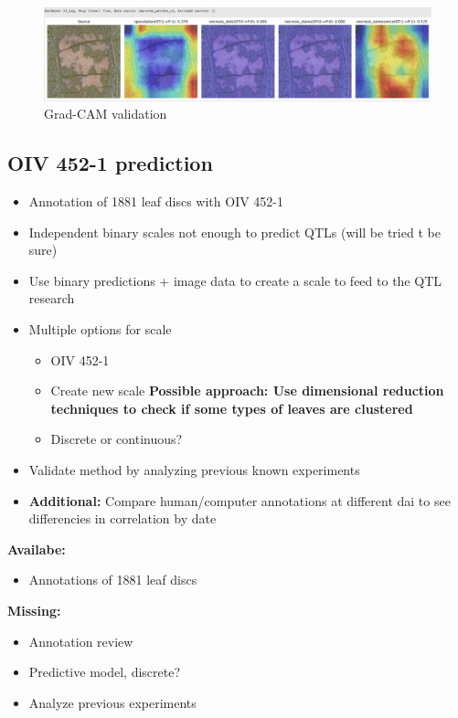 \documentclass[english]{article}
\begin{document}
\begin{figure}[H]
	\centering
	\includegraphics[width=0.8\linewidth]{gc_hf_seg_sen_high.png}
	\caption*{Grad-CAM validation}\label{fig:gradcamval}
\end{figure}

\subsection{OIV 452-1 prediction}

\begin{itemize}
	\item Annotation of 1881 leaf discs with OIV 452-1
	\item Independent binary scales not enough to predict QTLs (will be tried t be sure)
	\item Use binary predictions + image data to create a scale to feed to the QTL research
	\item Multiple options for scale
	      \begin{itemize}
		      \item OIV 452-1
		      \item Create new scale \textbf{Possible approach: Use dimensional reduction techniques to check if some types of leaves are clustered}
		      \item Discrete or continuous?
	      \end{itemize}
	\item Validate method by analyzing previous known experiments
	\item \textbf{Additional:} Compare human/computer annotations at different dai to see differencies in correlation by date
\end{itemize}

\textbf{Availabe:}
\begin{itemize}
	\item Annotations of 1881 leaf discs
\end{itemize}
\textbf{Missing:}
\begin{itemize}
	\item Annotation review
	\item Predictive model, discrete?
	\item Analyze previous experiments
\end{itemize}
\end{document}
